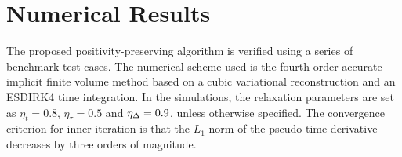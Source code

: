 %
%


\section{Numerical Results}
\label{sec:Results}

The proposed positivity-preserving algorithm is verified using a series of benchmark test cases.
The numerical scheme used is the fourth-order accurate implicit finite volume method based on a
cubic variational reconstruction and an ESDIRK4 time integration.
In the simulations, the relaxation parameters are set as $\eta_t= 0.8$, $\eta_\tau=0.5$ and $\eta_\mathrm\Delta=0.9$,
unless otherwise specified.
The convergence criterion for inner iteration is that
the $L_1$ norm of the pseudo time derivative decreases by three orders of magnitude.

